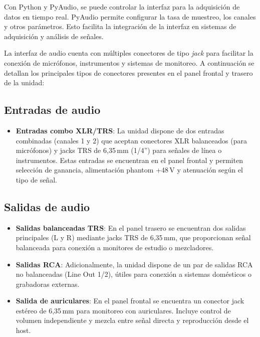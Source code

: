 Con Python y PyAudio, se puede controlar la interfaz para la adquisición de datos en tiempo real. PyAudio permite configurar la tasa de muestreo, los canales y otros parámetros. Esto facilita la integración de la interfaz en sistemas de adquisición y análisis de señales.

La interfaz de audio cuenta con múltiples conectores de tipo \emph{jack} para facilitar la conexión de micrófonos, instrumentos y sistemas de monitoreo. A continuación se detallan los principales tipos de conectores presentes en el panel frontal y trasero de la unidad:

\subsection*{Entradas de audio}

\begin{itemize}
    \item \textbf{Entradas combo XLR/TRS}: La unidad dispone de dos entradas combinadas (canales 1 y 2) que aceptan conectores XLR balanceados (para micrófonos) y jacks TRS de 6,35\,mm (1/4'') para señales de línea o instrumentos. Estas entradas se encuentran en el panel frontal y permiten selección de ganancia, alimentación phantom \mbox{+48\,V} y atenuación según el tipo de señal.
\end{itemize}

\subsection*{Salidas de audio}

\begin{itemize}
    \item \textbf{Salidas balanceadas TRS}: En el panel trasero se encuentran dos salidas principales (L y R) mediante jacks TRS de 6,35\,mm, que proporcionan señal balanceada para conexión a monitores de estudio o mezcladores.
    
    \item \textbf{Salidas RCA}: Adicionalmente, la unidad dispone de un par de salidas RCA no balanceadas (Line Out 1/2), útiles para conexión a sistemas domésticos o grabadoras externas.
    
    \item \textbf{Salida de auriculares}: En el panel frontal se encuentra un conector jack estéreo de 6,35\,mm para monitoreo con auriculares. Incluye control de volumen independiente y mezcla entre señal directa y reproducción desde el host.
\end{itemize}

